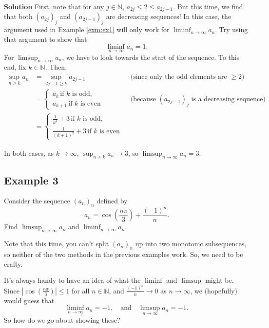 \documentclass[
  17pt,
  a4paper]{extarticle}
\theoremstyle{plain}
\theoremstyle{definition}
\theoremstyle{plain}
\theoremstyle{plain}
\theoremstyle{plain}
\theoremstyle{plain}
\theoremstyle{definition}
\theoremstyle{definition}
\theoremstyle{remark}
\theoremstyle{remark}
\let\BeginKnitrBlock\begin \let\EndKnitrBlock\end
\renewcommand{\;}{\,}
\begin{document}
\textbf{Solution}
First, note that for any \(j\in\mathbb{N}\), \(a_{2j} \leq 2 \leq a_{2j-1}\). But this time, we find that both \((a_{2j})_j\) and \((a_{2j-1})_j\) are decreasing sequences! In this case, the argument used in Example \ref{exm:ex1} will only work for \(\liminf_{n\to\infty} a_n.\) Try using that argument to show that \[\liminf_{n\to\infty}a_n = 1.\] For \(\limsup_{n\to\infty} a_n\), we have to look towards the start of the sequence. To this end, fix \(k \in \mathbb{N}\). Then,
\begin{align*}
\sup_{n\geq k}a_n &= \sup_{2j-1 \geq k} a_{2j - 1} \; \; &&\text{(since only the odd elements are $\geq 2$)}\\
&=\begin{cases}
a_k \; \text{if $k$ is odd},\\
a_{k+1} \; \text{if $k$ is even}\end{cases} \; \; &&\text{(because $(a_{2j-1})_j$ is a decreasing sequence)}\\
&=\begin{cases}
\frac{1}{k^2} + 3 \; \text{if $k$ is odd},\\
\frac{1}{(k+1)^2} + 3 \; \text{if $k$ is even}\end{cases}
\end{align*}

In both cases, as \(k \to \infty\), \(\sup_{n\geq k }a_n \to 3\), so \(\limsup_{n \to \infty} a_n = 3\).

\hypertarget{example-3}{%
\subsection*{Example 3}\label{example-3}}

\BeginKnitrBlock{example}
{\label{exm:ex3} }Consider the sequence \((a_n)_{n}\) defined by \[a_n = \cos\left(\frac{n\pi}{3}\right) + \frac{(-1)^n}{n}.\] Find \(\limsup_{n \to \infty} a_n\) and \(\liminf_{n \to \infty} a_n\).
\EndKnitrBlock{example}
Note that this time, you can't split \((a_n)_n\) up into two monotonic subsequences, so neither of the two methods in the previous examples work. So, we need to be crafty.

It's always handy to have an idea of what the \(\liminf\) and \(\limsup\) might be. Since \(\left\lvert\cos\left(\frac{n\pi}{3}\right)\right\rvert \leq 1\) for all \(n \in \mathbb{N}\), and \(\frac{(-1)^n}{n} \to 0\) as \(n \to \infty\), we (hopefully) would guess that \[\liminf_{n\to\infty}a_n = -1, \quad \text{and} \quad \limsup_{n \to \infty} a_n = -1.\] So how do we go about showing these?
\end{document}
